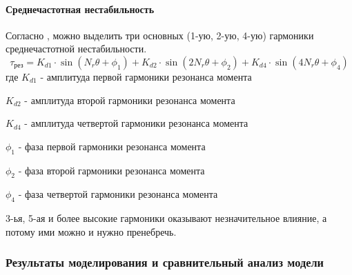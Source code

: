 \paragraph{Среднечастотная нестабильность}
Согласно \cite[ф-ла 5]{Novel_Modeling_and_Damping}, можно выделить три основных (1-ую, 2-ую, 4-ую)
гармоники среднечастотной нестабильности.
\begin{equation}
    \tau_{\text{рез}} =   K_{d1} \cdot \sin{ (  N_{r} \theta + \phi_{1}) }
                         + K_{d2} \cdot \sin{ (2 N_{r} \theta + \phi_{2}) }
                         + K_{d4} \cdot \sin{ (4 N_{r} \theta + \phi_{4}) }
\end{equation}
где $K_{d1}$ - амплитуда первой гармоники резонанса момента

$K_{d2}$ - амплитуда второй гармоники резонанса момента

$K_{d4}$ - амплитуда четвертой гармоники резонанса момента

$\phi_{1}$ - фаза первой гармоники резонанса момента

$\phi_{2}$ - фаза второй гармоники резонанса момента

$\phi_{4}$ - фаза четвертой гармоники резонанса момента

3-ья, 5-ая и более высокие гармоники оказывают незначительное влияние, а потому
ими можно и нужно пренебречь.

\subsubsection{Результаты моделирования и сравнительный анализ модели}
